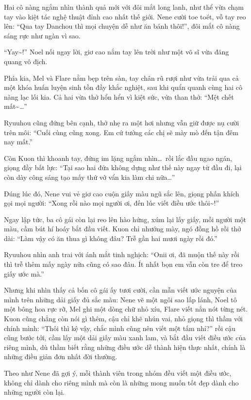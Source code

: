 \documentclass[../main.tex]{subfiles}
\begin{document}
Hai cô nàng ngắm nhìn thành quả mới với đôi mắt long lanh, như thể vừa chạm tay vào kiệt tác nghệ thuật đỉnh cao nhất thế giới. Nene cười toe toét, vỗ tay reo lên: ``Qua tay Danchou thì mọi chuyện dễ như ăn bánh thôi!'', đôi mắt cô nàng sáng rực như ngàn vì sao.

``Yay\~{}!'' Noel nối ngay lời, giơ cao nắm tay lên trời như một võ sĩ vừa đăng quang vô địch.

Phía kia, Mel và Flare nằm bẹp trên sàn, tay chân rũ rượi như vừa trải qua cả một khóa huấn luyện sinh tồn đầy khắc nghiệt, sau khi quẩn quanh cùng hai cô nàng lạc lối kia. Cả hai vừa thở hổn hển vì kiệt sức, vừa than thở: ``Mệt chết mất\~{}\dots''

Ryuuhou cũng đứng bên cạnh, thở nhẹ ra một hơi nhưng vẫn giữ được nụ cười trên môi: ``Cuối cùng cũng xong. Em cứ tưởng các chị sẽ mày mò đến tận đêm nay mất.''

Còn Kuon thì khoanh tay, đứng im lặng ngắm nhìn\dots\ rồi lắc đầu ngao ngán, giọng đầy bất lực: ``Tại sao hai đứa không dựng như thế này ngay từ đầu đi, lại còn dày công sáng tạo mấy thứ vớ vẩn kia làm chi nữa\dots''

Đúng lúc đó, Nene vui vẻ giơ cao cuộn giấy màu ngũ sắc lên, giọng phấn khích gọi mọi người: ``Xong rồi nào mọi người ơi, đến lúc viết điều ước thôi\~{}!''

Ngay lập tức, ba cô gái còn lại reo lên hào hứng, xúm lại lấy giấy, mỗi người một màu, cầm bút hí hoáy bắt đầu viết. Kuon chỉ nhướng mày, ngó đồng hồ rồi thở dài: ``Làm vậy có ăn thua gì không đâu? Trễ gần hai mươi ngày rồi đó.''

Ryuuhou nhìn anh trai với ánh mắt tinh nghịch: ``Onii ơi, đã muộn thế này rồi thì trễ thêm mấy ngày nữa cũng có sao đâu. Ít nhất bọn em vẫn còn tre để treo giấy ước mà.''

Nhưng khi nhìn thấy cả bốn cô gái ấy tươi cười, cần mẫn viết ước nguyện của mình trên những dải giấy đủ sắc màu: Nene vẽ một ngôi sao lấp lánh, Noel tô một bông hoa rực rỡ, Mel ghi một dòng chữ nhỏ xíu, Flare viết nắn nót từng nét. Kuon cũng chẳng còn nói gì thêm, cậu chỉ khẽ nhún vai, nhỏ giọng thì thầm với chính mình: ``Thôi thì kệ vậy, chắc mình cũng nên viết một tấm nhỉ?'' rồi cậu cũng bước tới, cầm lấy một dải giấy màu xanh lam, và bắt đầu viết điều ước của riêng mình, dù thầm biết rằng những điều ước dễ thành hiện thực nhất, chính là những điều giản đơn nhất đời thường.

\ct

Theo như Nene đã gợi ý, mỗi thành viên trong nhóm đều viết một điều ước, không chỉ dành cho riêng mình mà còn là những mong muốn tốt đẹp dành cho những người còn lại.
\end{document}
